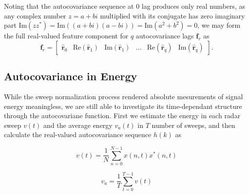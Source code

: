 Noting that the autocovariance sequence at 0 lag produces only real numbers, as any complex number $z = a + bi$ multiplied with its conjugate has zero imaginary part $\text{Im}(zz^*) = \text{Im}((a + bi)(a - bi)) = \text{Im}(a^2 + b^2) = 0$, we may form the full real-valued feature component for $q$ autocovariance lags $\mathbf{f}_{r}$ as
\begin{equation}
	\mathbf{f}_{r} = 
	\begin{bmatrix}
		\hat{\mathbf{r}}_{0}  & \text{Re}(\hat{\mathbf{r}}_{1} ) & \text{Im}(\hat{\mathbf{r}}_{1} ) & ... & \text{Re}(\hat{\mathbf{r}}_{q} ) & \text{Im}(\hat{\mathbf{r}}_{q} )
	\end{bmatrix}.
\end{equation}





\subsection{Autocovariance in Energy}

While the sweep normalization process rendered absolute mesurements of signal energy meaningless, we are still able to investigate its time-dependant structure through the autocovariane function. First we estimate the energy in each radar sweep $v(t)$ and the average energy $v_a(t)$ in $T$ number of sweeps, and then calculate the real-valued autocovariance sequence $h(k)$ as 

\begin{equation}
	v(t) = \frac{1}{N}\sum_{n=0}^{N-1}x(n,t)x^*(n,t)
\end{equation}

\begin{equation} 
	v_a = \frac{1}{T}\sum_{t=0}^{T-1}v(t)
\end{equation}

